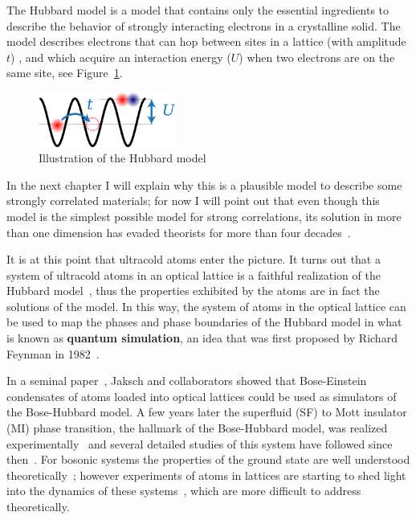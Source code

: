 \documentclass[oneside,11pt]{memoir}
\begin{document}
The Hubbard model is a model that contains only the essential ingredients to
describe the  behavior of strongly interacting electrons in a crystalline
solid.    The model describes electrons that can hop between sites in a lattice
(with amplitude $t$) , and which acquire an interaction energy ($U$) when two
electrons are on the same site, see Figure~\ref{fig:chap01hubbard}.  
\begin{figure} \centering
\includegraphics[width=0.4\textwidth]{../figures/hubbard/little-hubbard.png}
\caption[Hubbard model]{\small Illustration of the Hubbard model }
\label{fig:chap01hubbard}
\end{figure}
In the next chapter I will explain why this is a plausible model to
describe some strongly correlated materials;  for now I will point out that
even though this model is the simplest possible model for strong correlations,
its solution in more than one dimension has evaded theorists for more than four
decades~\cite{quintanilla2009strong}.

It is at this point that ultracold atoms enter the picture.   It turns out that
a system of ultracold atoms in an optical lattice is a faithful realization of
the Hubbard model~\cite{PhysRevLett.81.3108}, thus the properties exhibited
by the atoms are in fact the solutions of the model.    In this way, the system
of atoms in the optical lattice can be used to map the phases and phase
boundaries of the Hubbard model in what is known as \textbf{quantum
simulation}, an idea that was first proposed by  Richard Feynman in
1982~\cite{feynman1982simulating}. 

In a seminal paper~\cite{PhysRevLett.81.3108}, Jaksch and collaborators  showed
that Bose-Einstein condensates of atoms loaded into optical lattices could be
used as simulators of the Bose-Hubbard model.  A few years later the superfluid
(SF) to Mott insulator (MI) phase transition, the hallmark of the Bose-Hubbard
model, was realized experimentally~\cite{Greiner2002} and several detailed
studies of this system have followed since then~\cite{Gemelke2009,
Jimenez-Garcia2010, Trotzky2010, Mark2011, Zhang2012}.  For bosonic systems the
properties of the ground state are well understood
theoretically~\cite{freericks1994bosehubbard, trivedi1991mott,
PhysRevB.40.546};  however experiments of atoms in lattices are starting to
shed light into the dynamics of these systems~\cite{Fukuhara2013}, which are
more difficult to address theoretically.  
\end{document}
